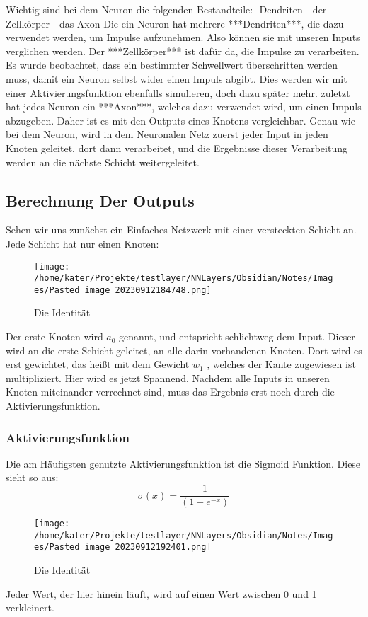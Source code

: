 \documentclass[12pt]{article}
\begin{document}
Wichtig sind bei dem Neuron die folgenden Bestandteile:- Dendriten
- der Zellkörper
- das Axon
  Die ein Neuron hat mehrere ***Dendriten***, die dazu verwendet werden, um Impulse aufzunehmen. Also können sie mit unseren Inputs verglichen werden. Der ***Zellkörper*** ist dafür da, die Impulse zu verarbeiten. Es wurde beobachtet, dass ein bestimmter Schwellwert überschritten werden muss, damit ein Neuron selbst wider einen Impuls abgibt. Dies werden wir mit einer Aktivierungsfunktion ebenfalls simulieren, doch dazu später mehr. zuletzt hat jedes Neuron ein ***Axon***, welches dazu verwendet wird, um einen Impuls abzugeben. Daher ist es mit den Outputs eines Knotens vergleichbar.
  Genau wie bei dem Neuron, wird in dem Neuronalen Netz zuerst jeder Input in jeden Knoten geleitet, dort dann verarbeitet, und die Ergebnisse dieser Verarbeitung werden an die nächste Schicht weitergeleitet.\subsection{ Berechnung Der Outputs}Sehen wir uns zunächst ein Einfaches Netzwerk mit einer versteckten Schicht an. Jede Schicht hat nur einen Knoten:
\begin{figure}[H]
\centering
\texttt{[image: /home/kater/Projekte/testlayer/NNLayers/Obsidian/Notes/Images/Pasted image 20230912184748.png]}
\caption{Die Identität}
\label{Was kommt hier rein?}\end{figure}Der erste Knoten wird $a_0$ genannt, und entspricht schlichtweg dem Input. Dieser wird an die erste Schicht geleitet, an alle darin vorhandenen Knoten. Dort wird es erst gewichtet, das heißt mit dem Gewicht $w_1$ , welches der Kante zugewiesen ist multipliziert. Hier wird es jetzt Spannend. Nachdem alle Inputs in unseren Knoten miteinander verrechnet sind, muss das Ergebnis erst noch durch die Aktivierungsfunktion.\subsubsection{ Aktivierungsfunktion}Die am Häufigsten genutzte Aktivierungsfunktion ist die Sigmoid Funktion. Diese sieht so aus:
$$\sigma (x)=\frac{1}{(1+e^{-x})}$$
\begin{figure}[H]
\centering
\texttt{[image: /home/kater/Projekte/testlayer/NNLayers/Obsidian/Notes/Images/Pasted image 20230912192401.png]}
\caption{Die Identität}
\label{Was kommt hier rein?}\end{figure}
Jeder Wert, der hier hinein läuft, wird auf einen Wert zwischen 0 und 1 verkleinert. 
\end{document}
